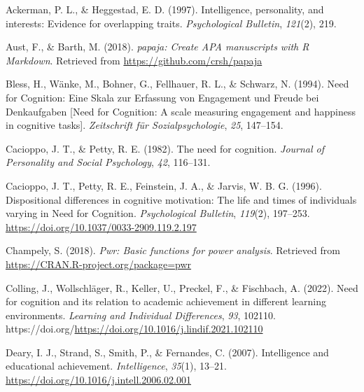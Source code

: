 \documentclass[
  man]{apa6}
\newlength{\cslhangindent}
\newlength{\cslentryspacingunit} %
\newenvironment{CSLReferences}[2] %
 {%
  \setlength{\parindent}{0pt}
  \ifodd #1
  \let\oldpar\par
  \def\par{\hangindent=\cslhangindent\oldpar}
  \fi
  \setlength{\parskip}{#2\cslentryspacingunit}
 }%
 {}
\begin{document}
\hypertarget{refs}{}
\begin{CSLReferences}{1}{0}
\leavevmode{}%
Ackerman, P. L., \& Heggestad, E. D. (1997). Intelligence, personality, and interests: Evidence for overlapping traits. \emph{Psychological Bulletin}, \emph{121}(2), 219.

\leavevmode{}%
Aust, F., \& Barth, M. (2018). \emph{{papaja}: {Create} {APA} manuscripts with {R Markdown}}. Retrieved from \url{https://github.com/crsh/papaja}

\leavevmode{}%
Bless, H., Wänke, M., Bohner, G., Fellhauer, R. L., \& Schwarz, N. (1994). Need for {C}ognition: {E}ine {S}kala zur {E}rfassung von {E}ngagement und {F}reude bei {D}enkaufgaben {[}{N}eed for {C}ognition: A scale measuring engagement and happiness in cognitive tasks{]}. \emph{Zeitschrift {f}{ü}r Sozialpsychologie}, \emph{25}, 147--154.

\leavevmode{}%
Cacioppo, J. T., \& Petty, R. E. (1982). The need for cognition. \emph{Journal of Personality and Social Psychology}, \emph{42}, 116--131.

\leavevmode{}%
Cacioppo, J. T., Petty, R. E., Feinstein, J. A., \& Jarvis, W. B. G. (1996). Dispositional differences in cognitive motivation: The life and times of individuals varying in {N}eed for {C}ognition. \emph{Psychological Bulletin}, \emph{119}(2), 197--253. \url{https://doi.org/10.1037/0033-2909.119.2.197}

\leavevmode{}%
Champely, S. (2018). \emph{Pwr: Basic functions for power analysis}. Retrieved from \url{https://CRAN.R-project.org/package=pwr}

\leavevmode{}%
Colling, J., Wollschläger, R., Keller, U., Preckel, F., \& Fischbach, A. (2022). Need for cognition and its relation to academic achievement in different learning environments. \emph{Learning and Individual Differences}, \emph{93}, 102110. https://doi.org/\url{https://doi.org/10.1016/j.lindif.2021.102110}

\leavevmode{}%
Deary, I. J., Strand, S., Smith, P., \& Fernandes, C. (2007). Intelligence and educational achievement. \emph{Intelligence}, \emph{35}(1), 13--21. \url{https://doi.org/10.1016/j.intell.2006.02.001}


\end{CSLReferences}
\end{document}
